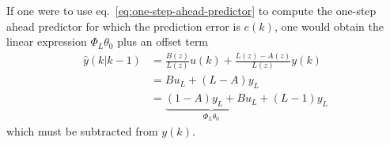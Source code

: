 If one were to use eq.~\eqref{eq:one-step-ahead-predictor} to compute the one-step ahead predictor for which the prediction error is $e(k)$, one would obtain the linear expression $\Phi_L\theta_0$ plus an offset term
\begin{align*}
  \hat{y}(k|k-1) &= \frac{B(z)}{L(z)}u(k) + \frac{L(z)-A(z)}{L(z)}y(k) \\
                 &= Bu_L + \left(L-A\right)y_L \\
                 &= \underbrace{\left(1-A\right)y_L + Bu_L}_{\Phi_L\theta_0} + \left(L-1\right)y_L
\end{align*}
which must be subtracted from $y(k)$.


